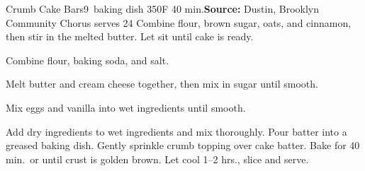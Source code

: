 \begin{recipe}{Crumb Cake Bars}{9\inch{}\inch\ baking dish \hfill 350\0F \hfill 40 min.}{\textbf{Source:} Dustin, Brooklyn Community Chorus \hfill serves 24}
 Combine flour, brown sugar, oats, and cinnamon, then stir in the melted butter. Let sit until cake is ready.

 Combine flour, baking soda, and salt.

 Melt butter and cream cheese together, then mix in sugar until smooth.

 Mix eggs and vanilla into wet ingredients until smooth.

 \newstep Add dry ingredients to wet ingredients and mix thoroughly. Pour batter into a greased baking dish.
 \newstep Gently sprinkle crumb topping over cake batter. Bake for 40 min.\ or until crust is golden brown. Let cool 1--2 hrs., slice and serve.
\end{recipe}
